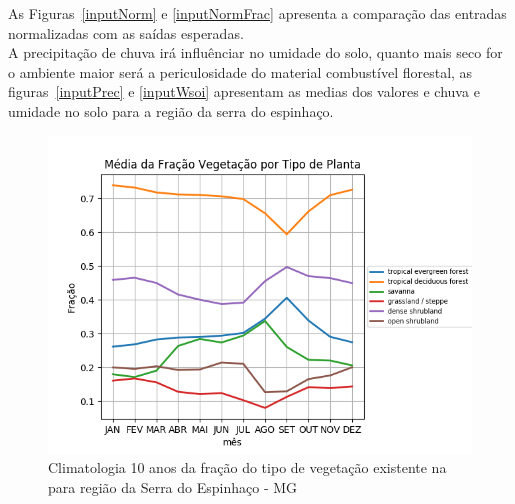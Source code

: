 \documentclass[conference]{IEEEtran}
\begin{document}
As Figuras~\ref{inputNorm} e \ref{inputNormFrac} apresenta a comparação das entradas normalizadas com as saídas esperadas.\\
A precipitação de chuva irá influênciar no umidade do solo, quanto mais seco for o ambiente maior será a periculosidade do material combustível florestal, as figuras~\ref{inputPrec} e \ref{inputWsoi} apresentam as medias dos valores e chuva e umidade no solo para a região da serra do espinhaço.\\
\begin{figure}[htbp]
\centerline{\includegraphics[width=0.44\paperwidth]{figuras/frac.png}}
\caption{Climatologia 10 anos da fração do tipo de vegetação existente na para região da Serra do Espinhaço - MG}
\label{inputFrac}
\end{figure}
\end{document}
